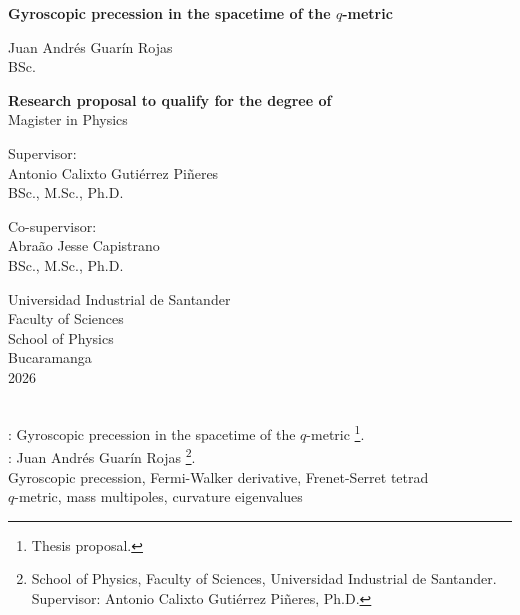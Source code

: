 \documentclass[12pt]{article}
\begin{document}
\thispagestyle{empty}
\begin{center}
	\Large{\bf Gyroscopic precession in the spacetime of the $q$-metric} \\
	\vspace{1.7cm}
	
	{\large Juan Andrés Guarín Rojas}\\
	{\large BSc.}
	\vspace{1.7cm}

	{\large \bf Research proposal to qualify for the degree of}\\
	{\large Magister in Physics} \\
	\vspace{1.7cm}

	{\large Supervisor:} \\
	{\large Antonio Calixto Gutiérrez Piñeres}\\  
	{\large BSc., M.Sc., Ph.D.}
	\vspace{1.6cm}

	{\large Co-supervisor:} \\
	{\large Abraão Jesse Capistrano}\\  
	{\large BSc., M.Sc., Ph.D.}
	\vspace{1.6cm}

	\vfill
	{\large Universidad Industrial de Santander}\\
	{\large Faculty of Sciences}\\
	{\large School of Physics}\\
	{\large Bucaramanga}\\
	{\large 2026}
\end{center}
\newpage

 \\

\vspace{0.1cm}
: Gyroscopic precession in the spacetime of the $q$-metric \footnote{Thesis proposal.}.\\

: Juan Andrés Guarín Rojas \footnote{School of Physics, Faculty of Sciences, Universidad Industrial de Santander. Supervisor: Antonio Calixto Gutiérrez Piñeres, Ph.D.}.\\

 Gyroscopic precession, Fermi-Walker derivative, Frenet-Serret tetrad\\ $q$-metric, mass multipoles, curvature eigenvalues\\
\end{document}

